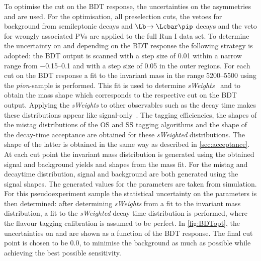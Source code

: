To optimise the cut on the \ac{BDT} response, the uncertainties on the \CP asymmetries \Sf and \Sfbar are used.
For the optimisation, all preselection cuts, the vetoes for background from semileptonic decays and $\Lb\!\to\Lcbar\pip$ decays and the veto for wrongly associated \ac{PV}s are applied to the full Run I data set.
To determine the uncertainty on \Sf and \Sfbar depending on the \ac{BDT} response the following strategy is adopted:
the \ac{BDT} output is scanned with a step size of \num{0.01} within a narrow range from \numrange{-0.15}{0.1} and with a step size of \num{0.05} in the outer regions.
For each cut on the \ac{BDT} response a fit to the invariant \Bz mass in the range \SIrange[per-mode=symbol]{5200}{5500}{\MeVcc} using the \emph{pion}-sample is performed.
This fit is used to determine \emph{sWeights}~\cite{Pivk:2004ty} and to obtain the mass shape which corresponds to the respective cut on the \ac{BDT} output.
Applying the \emph{sWeights} to other observables such as the decay time makes these distributions appear like signal-only~\cite{2009arXiv0905.0724X}.
The tagging efficiencies, the shapes of the mistag distributions of the OS and SS tagging algorithms and the shape of the decay-time acceptance are obtained for these \emph{sWeighted} distributions.
The shape of the latter is obtained in the same way as described in \cref{sec:acceptance}.
At each cut point the invariant mass distribution is generated using the obtained signal and background yields and shapes from the mass fit.
For the mistag and decaytime distribution, signal and background are both generated using the signal shapes.
The generated values for the \CP parameters are taken from simulation.
For this pseudoexperiment sample the statistical uncertainty on the \CP parameters is then determined: after determining \emph{sWeights} from a fit to the invariant \Bz mass distribution, a \CP fit to the \emph{sWeighted} decay time distribution is performed, where the flavour tagging calibration is assumed to be perfect.
In \cref{fig:BDTopt}, the uncertainties on \Sf and \Sfbar are shown as a function of the \ac{BDT} response.
The final cut point is chosen to be \num{0.0}, to minimise the background as much as possible while achieving the best possible sensitivity.

